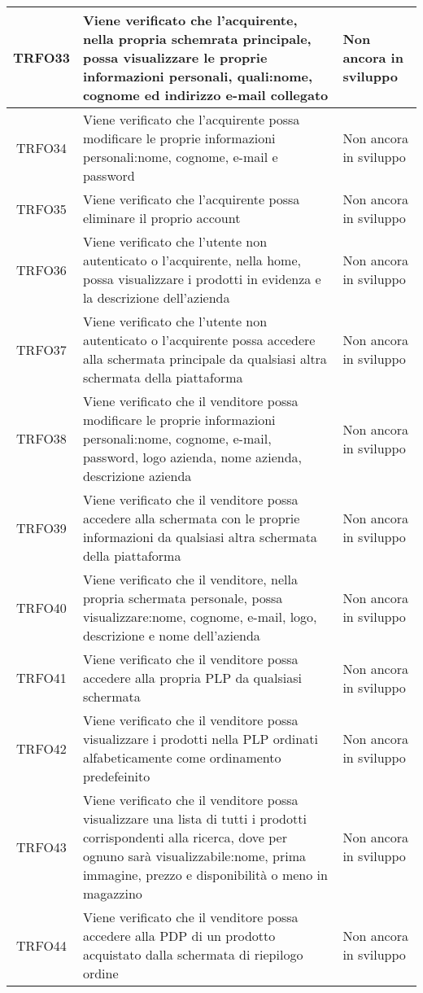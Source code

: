 \begin{longtable}{|c| C{10cm} |C{3cm}|}
	TRFO33 & Viene verificato che l'acquirente, nella propria schemrata principale, possa visualizzare le proprie informazioni personali, quali:nome, cognome ed indirizzo e-mail collegato & Non ancora in sviluppo\\ \hline
	TRFO34 & Viene verificato che l'acquirente possa modificare le proprie informazioni personali:nome, cognome, e-mail e password & Non ancora in sviluppo\\ \hline
	TRFO35 & Viene verificato che l'acquirente possa eliminare il proprio account & Non ancora in sviluppo\\ \hline
	TRFO36 & Viene verificato che l'utente non autenticato o l'acquirente, nella home, possa visualizzare i prodotti in evidenza e la descrizione dell'azienda & Non ancora in sviluppo\\ \hline
	TRFO37 & Viene verificato che l'utente non autenticato o l'acquirente possa accedere alla schermata principale da qualsiasi altra schermata della piattaforma & Non ancora in sviluppo\\ \hline
    	TRFO38 & Viene verificato che il venditore possa modificare le proprie informazioni personali:nome, cognome, e-mail, password, logo azienda, nome azienda, descrizione azienda & Non ancora in sviluppo\\ \hline
	TRFO39 & Viene verificato che il venditore possa accedere alla schermata con le proprie informazioni da qualsiasi altra schermata della piattaforma & Non ancora in sviluppo\\ \hline
    	TRFO40 & Viene verificato che il venditore, nella propria schermata personale, possa visualizzare:nome, cognome, e-mail, logo, descrizione e nome dell'azienda & Non ancora in sviluppo\\ \hline
	TRFO41 & Viene verificato che il venditore possa accedere alla propria PLP da qualsiasi schermata & Non ancora in sviluppo\\ \hline
	TRFO42 & Viene verificato che il venditore possa visualizzare i prodotti nella PLP ordinati alfabeticamente come ordinamento predefeinito & Non ancora in sviluppo\\ \hline
	TRFO43 & Viene verificato che il venditore possa visualizzare una lista di tutti i prodotti corrispondenti alla ricerca, dove per ognuno sarà visualizzabile:nome, prima immagine, prezzo e disponibilità o meno in magazzino & Non ancora in sviluppo\\ \hline
	TRFO44 & Viene verificato che il venditore possa accedere alla PDP di un prodotto acquistato dalla schermata di riepilogo ordine & Non ancora in sviluppo\\ \hline

\end{longtable}
